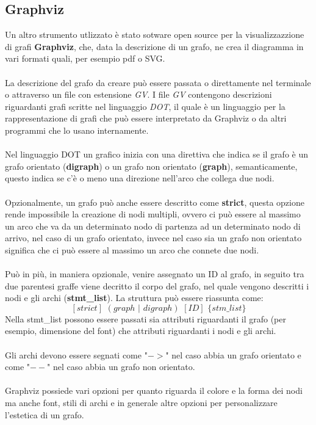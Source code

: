 \documentclass[12pt]{report}
\begin{document}
  \subsection{Graphviz}
  Un altro strumento utlizzato è stato sotware open source per la visualizzazzione di grafi \textbf{Graphviz}\cite{graphviz}, che, data la descrizione di un grafo, ne crea il diagramma in vari formati quali, per esempio pdf o SVG.\\\\
  La descrizione del grafo da creare può essere passata o direttamente nel terminale o attraverso un file con estensione \emph{GV}.
  I file \emph{GV} contengono descrizioni riguardanti grafi scritte nel linguaggio \emph{DOT}, il quale è un linguaggio per la rappresentazione di grafi che può essere interpretato da Graphviz o da altri programmi che lo usano internamente.\\\\
  Nel linguaggio DOT un grafico inizia con una direttiva che indica se il grafo è un grafo orientato (\textbf{digraph}) o un grafo non orientato (\textbf{graph}), semanticamente, questo indica se c'è o meno una direzione nell'arco che collega due nodi.\\\\
  Opzionalmente, un grafo può anche essere descritto come \textbf{strict}, questa opzione rende impossibile la creazione di nodi multipli, ovvero ci può essere al massimo un arco che va da un determinato nodo di partenza ad un determinato nodo di arrivo, nel caso di un grafo orientato, invece nel caso sia un grafo non orientato significa che ci può essere al massimo un arco che connete due nodi.\\\\
  Può in più, in maniera opzionale, venire assegnato un ID al grafo, in seguito tra due parentesi graffe viene decritto il corpo del grafo, nel quale vengono descritti i nodi e gli archi (\textbf{stmt\_list}). La struttura può essere riassunta come:
  \[[strict]\,\,(graph \,\,|\,\, digraph)\,\,[ID]\,\,\{stm\_list\} \]
  Nella stmt\_list possono essere passati sia attributi riguardanti il grafo (per esempio, dimensione del font) che attributi riguardanti i nodi e gli archi.\\\\
  Gli archi devono essere segnati come "$->$" nel caso abbia un grafo orientato e come "$--$" nel caso abbia un grafo non orientato.\\\\
  Graphviz possiede vari opzioni per quanto riguarda il colore e la forma dei nodi ma anche font, stili di archi e in generale altre opzioni per personalizzare l'estetica di un grafo.\\\\
\end{document}
